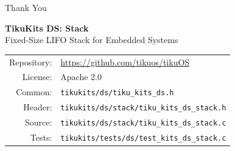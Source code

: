 \documentclass[aspectratio=169, 10pt]{beamer}
\begin{document}
\begin{frame}{Thank You}
\begin{center}
\Large\textbf{TikuKits DS: Stack}\\[0.5em]
\normalsize Fixed-Size LIFO Stack for Embedded Systems\\[1.5em]

\begin{tabular}{rl}
  Repository: & \url{https://github.com/tikuos/tikuOS} \\
  License:    & Apache 2.0 \\
  Common:     & \texttt{tikukits/ds/tiku\_kits\_ds.h} \\
  Header:     & \texttt{tikukits/ds/stack/tiku\_kits\_ds\_stack.h} \\
  Source:     & \texttt{tikukits/ds/stack/tiku\_kits\_ds\_stack.c} \\
  Tests:      & \texttt{tikukits/tests/ds/test\_kits\_ds\_stack.c} \\
\end{tabular}
\end{center}
\end{frame}
\end{document}
